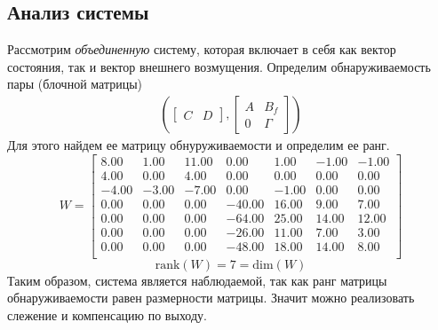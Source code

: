\subsection{Анализ системы}
Рассмотрим \textit{объединенную} систему, которая включает в себя как 
вектор состояния, так и вектор внешнего возмущения. Определим обнаруживаемость пары (блочной матрицы) 
\begin{eqnarray}
    \left(\begin{bmatrix}
        C & D
    \end{bmatrix}, \begin{bmatrix}
        A & B_f \\ 
        0 & \Gamma
    \end{bmatrix}\right) 
\end{eqnarray}
Для этого найдем ее матрицу обнуруживаемости и определим ее ранг. 
\begin{equation}
    W = \begin{bmatrix}
        8.00  & 1.00  & 11.00  & 0.00  & 1.00  & -1.00  & -1.00 \\ 
        4.00  & 0.00  & 4.00  & 0.00  & 0.00  & 0.00  & 0.00 \\ 
        -4.00  & -3.00  & -7.00  & 0.00  & -1.00  & 0.00  & 0.00 \\ 
        0.00  & 0.00  & 0.00  & -40.00  & 16.00  & 9.00  & 7.00 \\ 
        0.00  & 0.00  & 0.00  & -64.00  & 25.00  & 14.00  & 12.00 \\ 
        0.00  & 0.00  & 0.00  & -26.00  & 11.00  & 7.00  & 3.00 \\ 
        0.00  & 0.00  & 0.00  & -48.00  & 18.00  & 14.00  & 8.00 \\ 
    \end{bmatrix}
\end{equation}
\begin{equation}
    \text{rank}(W) = 7 = \text{dim}(W)
\end{equation}
Таким образом, система является наблюдаемой, так как ранг матрицы обнаруживаемости равен
размерности матрицы. Значит можно реализовать слежение и компенсацию по выходу.

